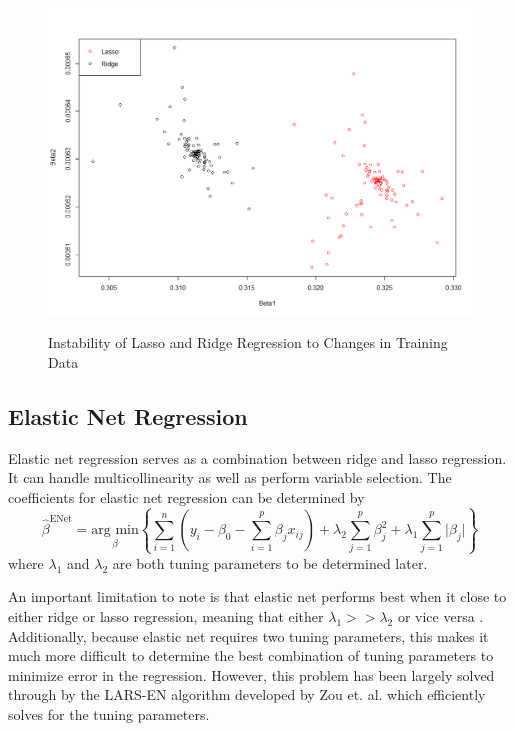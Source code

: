 \documentclass{article}
\newcommand{\argmin}[1]{\underset{\beta}{\text{arg min}}}
\begin{document}
\begin{figure}[!ht]
	\centering
	\caption{Instability of Lasso and Ridge Regression to Changes in Training Data}
	\includegraphics[width = 0.7\linewidth]{lassoVSridge-instability.png}
	\label{fig:lasso-and-ridge-instability}
\end{figure}

\subsection{Elastic Net Regression}
Elastic net regression serves as a combination between ridge and lasso regression. It can handle  multicollinearity as well as perform variable selection. The coefficients for elastic net regression can be determined by 
\begin{equation}
	\hat{\beta}^{\text{ENet}}=\argmin{\beta}\left\{ \sum\limits_{i = 1}^n \left( y_i - \beta_0 - \sum\limits_{i = 1}^p \beta_j x_{ij} \right) + \lambda_2\sum\limits_{j = 1}^p \beta_j^2 + \lambda_1\sum\limits_{j = 1}^p \vert \beta_j \vert \right\}
\end{equation}
where $\lambda_1$ and $\lambda_2$ are both tuning parameters to be determined later.

An important limitation to note is that elastic net performs best when it close to either ridge or lasso regression, meaning that either $\lambda_1 >> \lambda_2$ or vice versa \cite{zou2005regularization}. Additionally, because elastic net requires two tuning parameters, this makes it much more difficult to determine the best combination of tuning parameters to minimize error in the regression. However, this problem has been largely solved through by the LARS-EN algorithm developed by Zou et. al. which efficiently solves for the tuning parameters.
\end{document}
